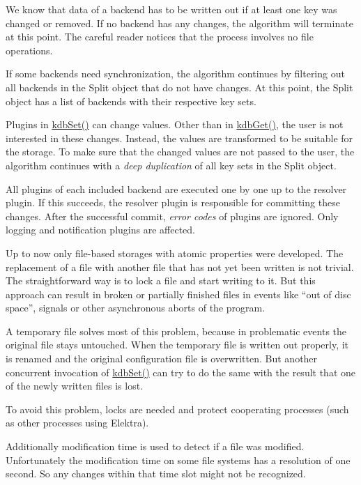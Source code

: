 We know that data of a backend has to be written out if at least one key was changed or removed. If no backend has any changes, the algorithm will terminate at this point. The careful reader notices that the process involves no file operations.

If some backends need synchronization, the algorithm continues by filtering out all backends in the {\ttfamily Split} object that do not have changes. At this point, the {\ttfamily Split} object has a list of backends with their respective key sets.

Plugins in {\ttfamily \hyperlink{group__kdb_ga11436b058408f83d303ca5e996832bcf}{kdb\+Set()}} can change values. Other than in {\ttfamily \hyperlink{group__kdb_ga28e385fd9cb7ccfe0b2f1ed2f62453a1}{kdb\+Get()}}, the user is not interested in these changes. Instead, the values are transformed to be suitable for the storage. To make sure that the changed values are not passed to the user, the algorithm continues with a {\itshape deep duplication} of all key sets in the {\ttfamily Split} object.

All plugins of each included backend are executed one by one up to the resolver plugin. If this succeeds, the resolver plugin is responsible for committing these changes. After the successful commit, {\itshape error codes} of plugins are ignored. Only logging and notification plugins are affected.

Up to now only file-\/based storages with atomic properties were developed. The replacement of a file with another file that has not yet been written is not trivial. The straightforward way is to lock a file and start writing to it. But this approach can result in broken or partially finished files in events like “out of disc space”, signals or other asynchronous aborts of the program.

A temporary file solves most of this problem, because in problematic events the original file stays untouched. When the temporary file is written out properly, it is renamed and the original configuration file is overwritten. But another concurrent invocation of {\ttfamily \hyperlink{group__kdb_ga11436b058408f83d303ca5e996832bcf}{kdb\+Set()}} can try to do the same with the result that one of the newly written files is lost.

To avoid this problem, locks are needed and protect cooperating processes (such as other processes using Elektra).

Additionally modification time is used to detect if a file was modified. Unfortunately the modification time on some file systems has a resolution of one second. So any changes within that time slot might not be recognized.

